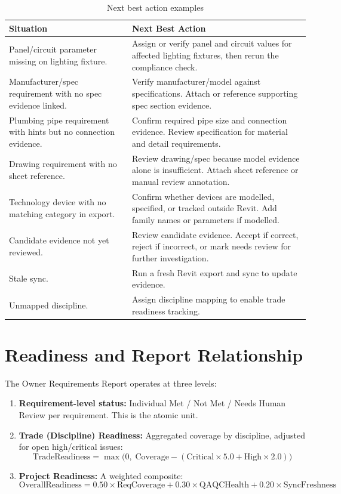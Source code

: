 \documentclass[10pt,letterpaper]{article}
\begin{document}
\begin{longtable}{p{2.4in}p{4.8in}}
\caption{Next best action examples}
\label{tab:next-action-examples}\\
\toprule
\textbf{Situation} & \textbf{Next Best Action} \\
\midrule
\endhead
Panel/circuit parameter missing on lighting fixture. & Assign or verify panel and circuit values for
  affected lighting fixtures, then rerun the compliance check. \\
Manufacturer/spec requirement with no spec evidence linked. & Verify manufacturer/model against
  specifications. Attach or reference supporting spec section evidence. \\
Plumbing pipe requirement with hints but no connection evidence. & Confirm required pipe size and
  connection evidence. Review specification for material and detail requirements. \\
Drawing requirement with no sheet reference. & Review drawing/spec because model evidence alone is
  insufficient. Attach sheet reference or manual review annotation. \\
Technology device with no matching category in export. & Confirm whether devices are modelled,
  specified, or tracked outside Revit. Add family names or parameters if modelled. \\
Candidate evidence not yet reviewed. & Review candidate evidence. Accept if correct, reject if
  incorrect, or mark needs review for further investigation. \\
Stale sync. & Run a fresh Revit export and sync to update evidence. \\
Unmapped discipline. & Assign discipline mapping to enable trade readiness tracking. \\
\bottomrule
\end{longtable}

\section{Readiness and Report Relationship}

The Owner Requirements Report operates at three levels:

\begin{enumerate}
  \item \textbf{Requirement-level status:} Individual Met / Not Met / Needs Human Review per
        requirement. This is the atomic unit.
  \item \textbf{Trade (Discipline) Readiness:} Aggregated coverage by discipline, adjusted for open
        high/critical issues:
        \[
        \text{TradeReadiness} = \max\bigl(0,\;
        \text{Coverage} - (\text{Critical} \times 5.0 + \text{High} \times 2.0)\bigr)
        \]
  \item \textbf{Project Readiness:} A weighted composite:
        \[
        \text{OverallReadiness} = 0.50 \times \text{ReqCoverage}
        + 0.30 \times \text{QAQCHealth}
        + 0.20 \times \text{SyncFreshness}
        \]
\end{enumerate}
\end{document}
